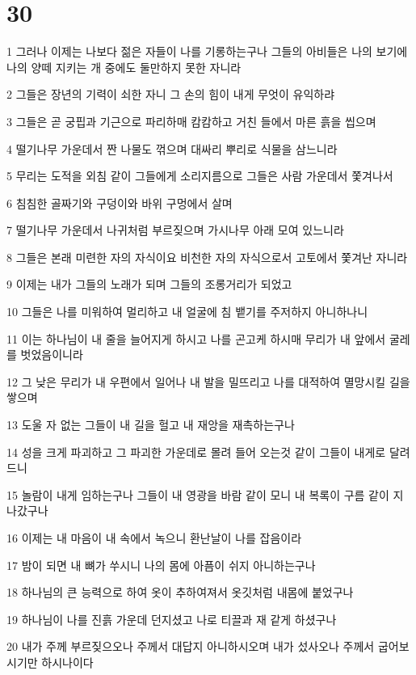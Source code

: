\chapter{30}

\par 1 그러나 이제는 나보다 젊은 자들이 나를 기롱하는구나 그들의 아비들은 나의 보기에 나의 양떼 지키는 개 중에도 둘만하지 못한 자니라
\par 2 그들은 장년의 기력이 쇠한 자니 그 손의 힘이 내게 무엇이 유익하랴
\par 3 그들은 곧 궁핍과 기근으로 파리하매 캄캄하고 거친 들에서 마른 흙을 씹으며
\par 4 떨기나무 가운데서 짠 나물도 꺾으며 대싸리 뿌리로 식물을 삼느니라
\par 5 무리는 도적을 외침 같이 그들에게 소리지름으로 그들은 사람 가운데서 쫓겨나서
\par 6 침침한 골짜기와 구덩이와 바위 구멍에서 살며
\par 7 떨기나무 가운데서 나귀처럼 부르짖으며 가시나무 아래 모여 있느니라
\par 8 그들은 본래 미련한 자의 자식이요 비천한 자의 자식으로서 고토에서 쫓겨난 자니라
\par 9 이제는 내가 그들의 노래가 되며 그들의 조롱거리가 되었고
\par 10 그들은 나를 미워하여 멀리하고 내 얼굴에 침 뱉기를 주저하지 아니하나니
\par 11 이는 하나님이 내 줄을 늘어지게 하시고 나를 곤고케 하시매 무리가 내 앞에서 굴레를 벗었음이니라
\par 12 그 낮은 무리가 내 우편에서 일어나 내 발을 밀뜨리고 나를 대적하여 멸망시킬 길을 쌓으며
\par 13 도울 자 없는 그들이 내 길을 헐고 내 재앙을 재촉하는구나
\par 14 성을 크게 파괴하고 그 파괴한 가운데로 몰려 들어 오는것 같이 그들이 내게로 달려드니
\par 15 놀람이 내게 임하는구나 그들이 내 영광을 바람 같이 모니 내 복록이 구름 같이 지나갔구나
\par 16 이제는 내 마음이 내 속에서 녹으니 환난날이 나를 잡음이라
\par 17 밤이 되면 내 뼈가 쑤시니 나의 몸에 아픔이 쉬지 아니하는구나
\par 18 하나님의 큰 능력으로 하여 옷이 추하여져서 옷깃처럼 내몸에 붙었구나
\par 19 하나님이 나를 진흙 가운데 던지셨고 나로 티끌과 재 같게 하셨구나
\par 20 내가 주께 부르짖으오나 주께서 대답지 아니하시오며 내가 섰사오나 주께서 굽어보시기만 하시나이다
